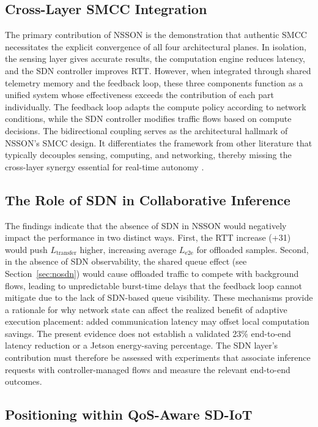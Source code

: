 \documentclass[journal]{IEEEtran}
\newcommand{\revblue}[1]{\textcolor{revblue}{#1}}
\begin{document}
\subsection{Cross-Layer SMCC Integration}
The primary contribution of NSSON is the demonstration that authentic SMCC necessitates the explicit convergence of all four architectural planes. In isolation, the sensing layer gives accurate results, the computation engine reduces latency, and the SDN controller improves RTT. However, when integrated through shared telemetry memory and the feedback loop, these three components function as a unified system whose effectiveness exceeds the contribution of each part individually. The feedback loop adapts the compute policy according to network conditions, while the SDN controller modifies traffic flows based on compute decisions. The bidirectional coupling serves as the architectural hallmark of NSSON's SMCC design. It differentiates the framework from other literature that typically decouples sensing, computing, and networking, thereby missing the cross-layer synergy essential for real-time autonomy \cite{10812728,9453402,chiang2023management,zeb2023toward}.

\subsection{The Role of SDN in Collaborative Inference}

The findings indicate that the absence of SDN in NSSON would negatively impact the performance in two distinct ways. First, the RTT increase (+31) would push
$L_{\text{transfer}}$ higher, increasing average $L_{\text{e2e}}$ for
offloaded samples. Second, in the absence of SDN observability, the shared queue effect (see Section~\ref{sec:nosdn}) would cause offloaded traffic to compete with background flows, leading to unpredictable burst-time delays that the feedback loop cannot mitigate due to the lack of SDN-based queue visibility.
These mechanisms provide a rationale for why network state can affect the realized benefit of adaptive execution placement: added communication latency may offset local computation savings. The present evidence does not establish a validated 23\% end-to-end latency reduction or a Jetson energy-saving percentage. The SDN layer's contribution must therefore be assessed with experiments that associate inference requests with controller-managed flows and measure the relevant end-to-end outcomes.

\subsection{\revblue{Positioning within QoS-Aware SD-IoT}}
\end{document}
